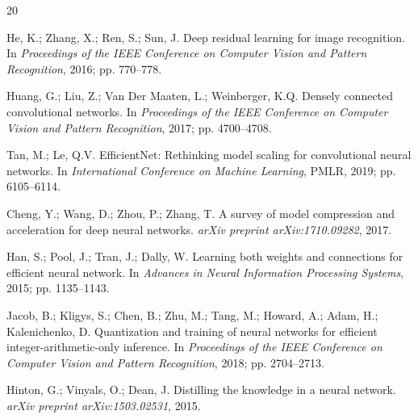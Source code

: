 \documentclass[symmetry,article,submit,moreauthors]{Definitions/mdpi}
\begin{document}


\begin{thebibliography}{20}

He, K.; Zhang, X.; Ren, S.; Sun, J. Deep residual learning for image recognition. In \textit{Proceedings of the IEEE Conference on Computer Vision and Pattern Recognition}, 2016; pp. 770--778.

Huang, G.; Liu, Z.; Van Der Maaten, L.; Weinberger, K.Q. Densely connected convolutional networks. In \textit{Proceedings of the IEEE Conference on Computer Vision and Pattern Recognition}, 2017; pp. 4700--4708.

Tan, M.; Le, Q.V. EfficientNet: Rethinking model scaling for convolutional neural networks. In \textit{International Conference on Machine Learning}, PMLR, 2019; pp. 6105--6114.

Cheng, Y.; Wang, D.; Zhou, P.; Zhang, T. A survey of model compression and acceleration for deep neural networks. \textit{arXiv preprint arXiv:1710.09282}, 2017.

Han, S.; Pool, J.; Tran, J.; Dally, W. Learning both weights and connections for efficient neural network. In \textit{Advances in Neural Information Processing Systems}, 2015; pp. 1135--1143.

Jacob, B.; Kligys, S.; Chen, B.; Zhu, M.; Tang, M.; Howard, A.; Adam, H.; Kalenichenko, D. Quantization and training of neural networks for efficient integer-arithmetic-only inference. In \textit{Proceedings of the IEEE Conference on Computer Vision and Pattern Recognition}, 2018; pp. 2704--2713.

Hinton, G.; Vinyals, O.; Dean, J. Distilling the knowledge in a neural network. \textit{arXiv preprint arXiv:1503.02531}, 2015.


\end{thebibliography}
\end{document}
